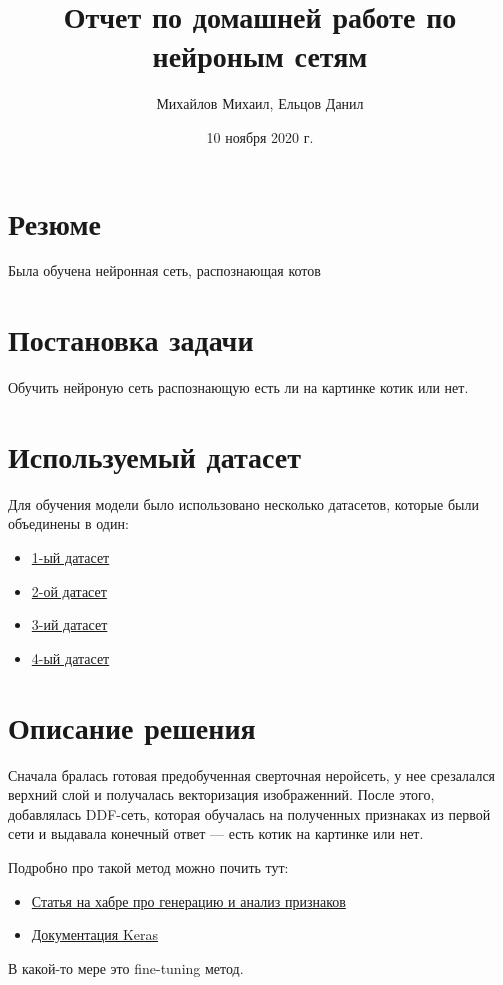 \documentclass{article}
\title{Отчет по домашней работе по нейроным сетям}
\author{Михайлов Михаил, Ельцов Данил}
\date{10 ноября 2020 г.}
\begin{document}
\maketitle
\tableofcontents

\section*{Резюме}
Была обучена нейронная сеть, распознающая котов
\newpage
\section{Постановка задачи}
Обучить нейроную сеть распознающую есть ли на картинке котик или нет.

\section{Используемый датасет}
Для обучения модели было использовано несколько датасетов, которые были объединены в один:

\begin{itemize}
    \item \href{https://storage.googleapis.com/openimages/web/extended.html}{1-ый датасет}
    \item \href{https://www.kaggle.com/alessiocorrado99/animals10}{2-ой датасет}
    \item \href{https://www.kaggle.com/zippyz/cats-and-dogs-breeds-classification-oxford-dataset}{3-ий датасет}
    \item \href{https://www.kaggle.com/crawford/cat-dataset}{4-ый датасет}
\end{itemize}

\section{Описание решения}
Сначала бралась готовая предобученная сверточная неройсеть, у нее срезалался верхний слой и получалась векторизация изображенний. После этого, добавлялась DDF-сеть, которая обучалась на полученных признаках из первой сети и выдавала конечный ответ --- есть котик на картинке или нет. 

Подробно про такой метод можно почить тут:
\begin{itemize}
    \item \href{https://habr.com/ru/company/ods/blog/325422/}{Статья на хабре про генерацию и анализ признаков}
    \item \href{https://keras.io/guides/sequential_model/}{Документация Keras}
\end{itemize}
В какой-то мере это fine-tuning метод. 
\end{document}
